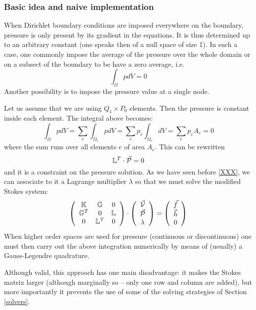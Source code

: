 
\subsubsection{Basic idea and naive implementation}

When Dirichlet boundary conditions are imposed everywhere on the boundary, pressure is only present by its gradient in 
the equations. It is thus determined up to an arbitrary constant (one speaks then of a null space of size 1).  
In such a case, one commonly impose the average of the pressure over the whole domain or on a subsect of the boundary 
to be have a zero average, i.e.
\[
\int_\Omega p dV = 0
\]
Another possibility is to impose the pressure value at a single node. 

Let us assume that we are using $Q_1 \times P_0$ elements. Then the pressure is constant 
inside each element. 
The integral above becomes:
\[
\int_\Omega p dV = 
\sum_e  \int_{\Omega_e} p dV = 
\sum_e  p_e \int_{\Omega_e} dV = 
\sum_e  p_e A_e = 0
\]
where the sum runs over all elements $e$ of area $A_e$.
This can be rewritten 
\[
{\mathbb{L}}^T \cdot \vec{\cal P}=0
\] 
and it is a constraint on the pressure solution. 
As we have seen before \ref{XXX}, we can associate to it a 
Lagrange multiplier $\lambda$ so that we must solve the modified Stokes system:
\[
\left(
\begin{array}{ccc}
{\mathbb{K}} & {\mathbb{G}} & 0\\ 
{\mathbb{G}}^T & 0 & {\mathbb{L}} \\
0 & {\mathbb{L}}^T & 0
\end{array}
\right)
\cdot
\left(
\begin{array}{c}
\vec{\cal V} \\ \vec{\cal P} \\ \lambda
\end{array}
\right)
=
\left(
\begin{array}{c}
\vec{f} \\ \vec{h} \\ 0
\end{array}
\right)
\]
When higher order spaces are used for pressure (continuous or discontinuous)
one must then carry out the above integration numerically by means of (usually)
a Gauss-Legendre quadrature.

Although valid, this approach has one main disadvantage: it makes the Stokes matrix larger (although
marginally so -- only one row and column are added), but more importantly it prevents the use of some
of the solving strategies of Section \ref{solvers}.



